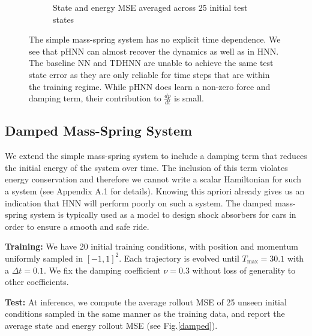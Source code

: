 \documentclass{article}
\begin{document}
\begin{figure}[h!]
\begin{subfigure}[b]{0.48\textwidth}
		\caption{State and energy MSE averaged across 25 initial test states}
	\end{subfigure}
\caption{The simple mass-spring system has no explicit time dependence. We see that pHNN can almost recover the dynamics as well as in HNN. The baseline NN and TDHNN are unable to achieve the same test state error as they are only reliable for time steps that are within the training regime. While pHNN does learn a non-zero force and damping term, their contribution to $\frac{dp}{dt}$ is small.}
\label{mspring}
\end{figure}

\subsection{Damped Mass-Spring System}

We extend the simple mass-spring system to include a damping term that reduces the initial energy of the system over time. The inclusion of this term violates energy conservation and therefore we cannot write a scalar Hamiltonian for such a system (see Appendix A.1 for details). Knowing this apriori already gives us an indication that HNN will perform poorly on such a system. The damped mass-spring system is typically used as a model to design shock absorbers for cars in order to ensure a smooth and safe ride. 

\textbf{Training:} We have 20 initial training conditions, with position and momentum uniformly sampled in $[-1,1]^2$. Each trajectory is evolved until $T_{\max} = 30.1$ with a $\Delta t = 0.1$. We fix the damping coefficient $\nu = 0.3$ without loss of generality to other coefficients.

\textbf{Test:} At inference, we compute the average rollout MSE of 25 unseen initial conditions sampled in the same manner as the training data, and report the average state and energy rollout MSE (see Fig.\ref{damped}).
\end{document}

